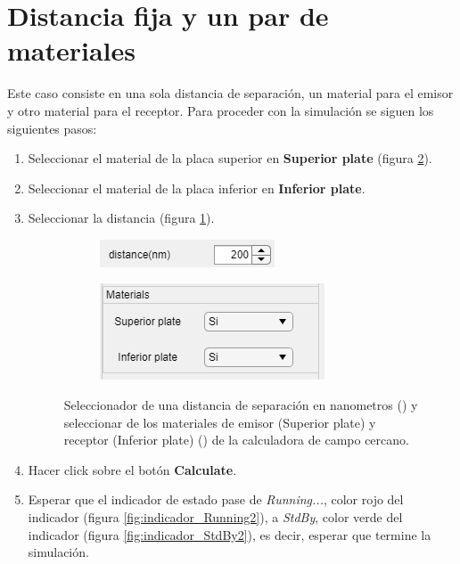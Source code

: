 \section{Distancia fija y un par de materiales} \label{DfMf}
Este caso consiste en una sola distancia de separación, un material para el emisor y otro material para el receptor.
Para proceder con la simulación se siguen los siguientes pasos:
\begin{enumerate}
	\item Seleccionar el material de la placa superior en \textbf{Superior plate} (figura \ref{unParMat}). 
	\item Seleccionar el material de la placa inferior en \textbf{Inferior plate}.
	\item Seleccionar la distancia (figura \ref{unaDistancia}). 
		\begin{figure}[H]
			\centering
			\begin{subfigure}[b]{.48\textwidth}
				\centering
					\includegraphics{figuras/unaDistancia.PNG}
				\caption{ }
				\label{unaDistancia}
			\end{subfigure} \hfill
			\begin{subfigure}[b]{.48\textwidth}
				\centering
					\includegraphics{figuras/unParMat.PNG}
					\caption{ }
				\label{unParMat}
			\end{subfigure}
			\caption{Seleccionador de una distancia de separación en nanometros () y seleccionar de los materiales de emisor (Superior plate) y receptor (Inferior plate) () de la calculadora de campo cercano.}
			\label{fig:sencillo}
		\end{figure}	
	\item Hacer click sobre el botón \textbf{Calculate}.
	\item Esperar que el indicador de estado pase de \textit{Running...}, color rojo del indicador (figura \ref{fig:indicador_Running2}), a \textit{StdBy}, color verde del indicador (figura \ref{fig:indicador_StdBy2}), es decir, esperar que termine la simulación.
\end{enumerate}
